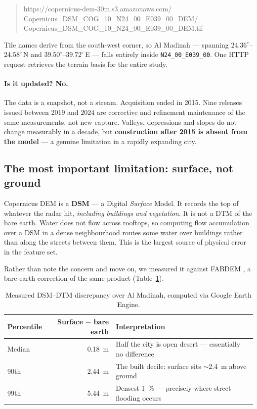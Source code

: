 \documentclass[11pt,a4paper]{article}
\newcommand{\ttt}[1]{\texttt{#1}}
\begin{document}
\begin{quote}\ttfamily\footnotesize
https://copernicus-dem-30m.s3.amazonaws.com/\\
\hspace*{1em}Copernicus\_DSM\_COG\_10\_N24\_00\_E039\_00\_DEM/\\
\hspace*{1em}Copernicus\_DSM\_COG\_10\_N24\_00\_E039\_00\_DEM.tif
\end{quote}

Tile names derive from the south-west corner, so Al Madinah --- spanning
$24.36^{\circ}$--$24.58^{\circ}$\,N and $39.50^{\circ}$--$39.72^{\circ}$\,E --- falls
entirely inside \ttt{N24\_00\_E039\_00}. One HTTP request retrieves the terrain basis for
the entire study.

\paragraph{Is it updated? No.}
The data is a snapshot, not a stream. Acquisition ended in 2015. Nine releases issued
between 2019 and 2024 are corrective and refinement maintenance of the same measurements,
not new capture. Valleys, depressions and slopes do not change measurably in a decade,
but \textbf{construction after 2015 is absent from the model} --- a genuine limitation in
a rapidly expanding city.

\subsection{The most important limitation: surface, not ground}\label{sec:dsm}
Copernicus DEM is a \textbf{DSM} --- a Digital \emph{Surface} Model. It records the top
of whatever the radar hit, \emph{including buildings and vegetation}. It is not a DTM of
the bare earth. Water does not flow across rooftops, so computing flow accumulation over
a DSM in a dense neighbourhood routes some water over buildings rather than along the
streets between them. This is the largest source of physical error in the feature set.

Rather than note the concern and move on, we measured it against FABDEM
\citep{hawker2022fabdem}, a bare-earth correction of the same product
(Table~\ref{tab:dsm-dtm}).

\begin{table}[htbp]\centering\small
\caption{Measured DSM--DTM discrepancy over Al Madinah, computed via Google Earth Engine.}
\label{tab:dsm-dtm}
\begin{tabular}{@{}lrp{7.4cm}@{}}
\toprule
Percentile & Surface $-$ bare earth & Interpretation\\
\midrule
Median & \SI{0.18}{\metre} & Half the city is open desert --- essentially no difference\\
\rowcolor{rowtint}
90th & \SI{2.44}{\metre} & The built decile: surface sits $\sim$\SI{2.4}{\metre} above ground\\
\rowcolor{rowtint}
99th & \SI{5.44}{\metre} & Densest \SI{1}{\percent} --- precisely where street flooding occurs\\
\bottomrule
\end{tabular}
\end{table}
\end{document}
